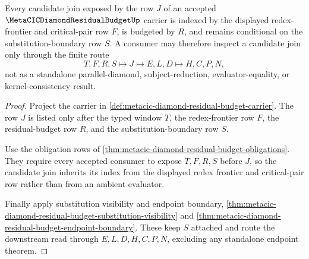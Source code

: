 \begin{theorem}
\label{thm:metacic-diamond-residual-budget-critical-pair-route}
Every candidate join exposed by the row $J$ of an accepted $\MetaCICDiamondResidualBudgetUp$ carrier is indexed by the displayed redex-frontier and critical-pair row $F$, is budgeted by $R$, and remains conditional on the substitution-boundary row $S$. A consumer may therefore inspect a candidate join only through the finite route
$$
T,F,R,S \longmapsto J \longmapsto E,L,D \longmapsto H,C,P,N ,
$$
not as a standalone parallel-diamond, subject-reduction, evaluator-equality, or kernel-consistency result.
\end{theorem}
\begin{proof}
Project the carrier in \autoref{def:metacic-diamond-residual-budget-carrier}. The row $J$ is listed only after the typed window $T$, the redex-frontier row $F$, the residual-budget row $R$, and the substitution-boundary row $S$.

Use the obligation rows of \autoref{thm:metacic-diamond-residual-budget-obligations}. They require every accepted consumer to expose $T,F,R,S$ before $J$, so the candidate join inherits its index from the displayed redex frontier and critical-pair row rather than from an ambient evaluator.

Finally apply substitution visibility and endpoint boundary, \autoref{thm:metacic-diamond-residual-budget-substitution-visibility} and \autoref{thm:metacic-diamond-residual-budget-endpoint-boundary}. These keep $S$ attached and route the downstream read through $E,L,D,H,C,P,N$, excluding any standalone endpoint theorem.
\end{proof}

